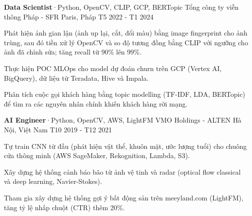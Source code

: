 \begin{cventries}
  \cventry
    {\textbf{Data Scientist}{\enskip·\enskip}{\fontsize{7.5pt}{1em}\selectfont Python, OpenCV, CLIP, GCP, BERTopic}} %
    {Tổng công ty viễn thông Pháp - SFR} %
    {Paris, Pháp} %
    {T5 2022 - T1 2024} %
    {
      \begin{cvitems} %
        \item {Phát hiện ảnh gian lận (ảnh up lại, cắt, đổi màu) bằng image fingerprint cho ảnh trùng, sau đó tiền xử lý OpenCV và so độ tương đồng bằng CLIP với ngưỡng cho ảnh đã chỉnh sửa; tăng recall từ 90\% lên 99\%.}
        \item {Thực hiện POC MLOps cho model dự đoán churn trên GCP (Vertex AI, BigQuery), dữ liệu từ Teradata, Hive và Impala.}
        \item {Phân tích cuộc gọi khách hàng bằng topic modelling (TF-IDF, LDA, BERTopic) để tìm ra các nguyên nhân chính khiến khách hàng rời mạng.}
      \end{cvitems}
    }

  \cventry
    {\textbf{AI Engineer}{\enskip·\enskip}{\fontsize{7.5pt}{1em}\selectfont Python, OpenCV, AWS, LightFM}} %
    {VMO Holdings - ALTEN} %
    {Hà Nội, Việt Nam} %
    {T10 2019 - T12 2021} %
    {
      \begin{cvitems} %
        \item {Tự train CNN từ đầu (phát hiện vật thể, khuôn mặt, ước lượng tuổi) cho chuông cửa thông minh (AWS SageMaker, Rekognition, Lambda, S3).}
        \item {Xây dựng hệ thống cảnh báo bão từ ảnh vệ tinh và radar (optical flow classical và deep learning, Navier-Stokes).}
        \item {Tham gia xây dựng hệ thống gợi ý bất động sản trên meeyland.com (LightFM), tăng tỷ lệ nhấp chuột (CTR) thêm 20\%.}
      \end{cvitems}
    }

\end{cventries}
